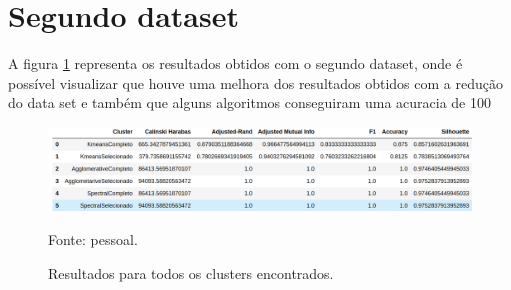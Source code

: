 \section{Segundo dataset}
A figura \ref{fig:resultDim128} representa os resultados obtidos com o segundo dataset, onde é possível visualizar que houve uma melhora dos resultados obtidos com a redução do data set e também que 
alguns algoritmos conseguiram uma acuracia de 100%
\begin{figure}[h]
	\centering
	\includegraphics[width=0.7\linewidth]{images/result_dim128}
	\caption{Resultados para todos os clusters encontrados.}
	Fonte: pessoal.
	\label{fig:resultDim128}
\end{figure}